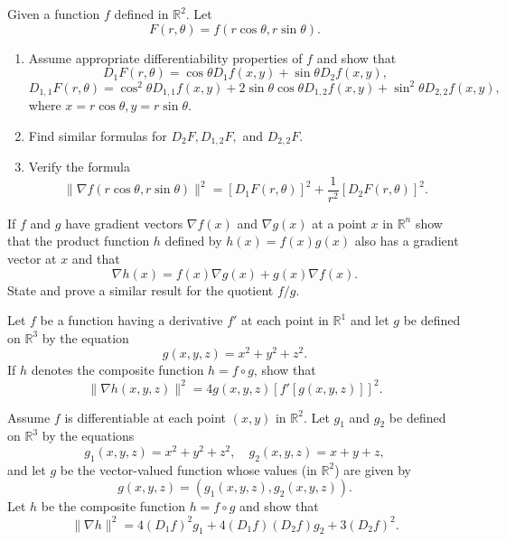 \begin{problembox}
Given a function \( f \) defined in \( \mathbb{R}^2 \). Let
\[F(r, \theta) = f(r \cos \theta, r \sin \theta).\]
\begin{enumerate}[label=(\alph*)]
\item Assume appropriate differentiability properties of \( f \) and show that
\[D_1F(r, \theta) = \cos \theta D_1f(x, y) + \sin \theta D_2f(x, y),\]
\[D_{1,1}F(r, \theta) = \cos^2 \theta D_{1,1}f(x, y) + 2 \sin \theta \cos \theta D_{1,2}f(x, y) + \sin^2 \theta D_{2,2}f(x, y),\]
where \( x = r \cos \theta, y = r \sin \theta \).
\item Find similar formulas for \( D_2F, D_{1,2}F, \) and \( D_{2,2}F \).
\item Verify the formula
\[\| \nabla f(r \cos \theta, r \sin \theta) \|^2 = [D_1F(r, \theta)]^2 + \frac{1}{r^2} [D_2F(r, \theta)]^2.\]
\end{enumerate}
\end{problembox}

\begin{problembox}
If \( f \) and \( g \) have gradient vectors \( \nabla f(x) \) and \( \nabla g(x) \) at a point \( x \) in \( \mathbb{R}^n \) show that the product function \( h \) defined by \( h(x) = f(x)g(x) \) also has a gradient vector at \( x \) and that
\[\nabla h(x) = f(x)\nabla g(x) + g(x)\nabla f(x).\]
State and prove a similar result for the quotient \( f/g \).
\end{problembox}

\begin{problembox}
Let \( f \) be a function having a derivative \( f' \) at each point in \( \mathbb{R}^1 \) and let \( g \) be defined on \( \mathbb{R}^3 \) by the equation
\[g(x, y, z) = x^2 + y^2 + z^2.\]
If \( h \) denotes the composite function \( h = f \circ g \), show that
\[\| \nabla h(x, y, z) \|^2 = 4g(x, y, z)[f'[g(x, y, z)]]^2.\]
\end{problembox}

\begin{problembox}
Assume \( f \) is differentiable at each point \( (x, y) \) in \( \mathbb{R}^2 \). Let \( g_1 \) and \( g_2 \) be defined on \( \mathbb{R}^3 \) by the equations
\[g_1(x, y, z) = x^2 + y^2 + z^2, \quad g_2(x, y, z) = x + y + z,\]
and let \( g \) be the vector-valued function whose values (in \( \mathbb{R}^2 \)) are given by
\[g(x, y, z) = (g_1(x, y, z), g_2(x, y, z)).\]
Let \( h \) be the composite function \( h = f \circ g \) and show that
\[\| \nabla h \|^2 = 4(D_1f)^2g_1 + 4(D_1f)(D_2f)g_2 + 3(D_2f)^2.\]
\end{problembox}

